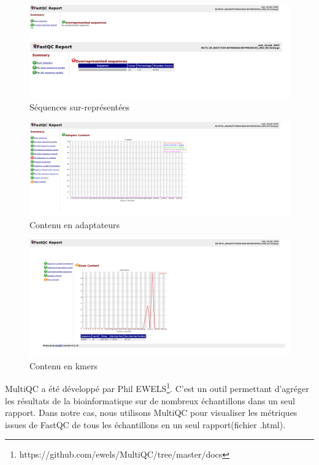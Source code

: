 \documentclass[a4paper,11pt]{article}
\begin{document}
\begin{figure}
  \begin{center}
    \includegraphics[width=16cm]{Images/FastqcMetrics9_Sample1_R1}
  \end{center}
  \caption{Séquences sur-représentées}
  \label{fig-FastqcMetrics1_Sample9_R1}
\end{figure}

\begin{figure}
  \begin{center}
    \includegraphics[width=16cm]{Images/FastqcMetrics10_Sample1_R1}
  \end{center}
  \caption{Contenu en adaptateurs}
  \label{fig-FastqcMetrics1_Sample10_R1}
\end{figure}

\begin{figure}
  \begin{center}
    \includegraphics[width=16cm]{Images/FastqcMetrics11_Sample1_R1}
  \end{center}
  \caption{Contenu en kmers}
  \label{fig-FastqcMetrics1_Sample11_R1}
\end{figure}

\newpage

MultiQC a été développé par Phil
EWELS\footnote{{https://github.com/ewels/MultiQC/tree/master/docs}}. C'est
un outil permettant d’agréger les résultats de la bioinformatique sur
de nombreux échantillons dans un seul rapport. Dans notre cas, nous
utilisons MultiQC pour visualiser les métriques issues de FastQC de tous les
échantillons en un seul rapport(fichier .html).
\end{document}
